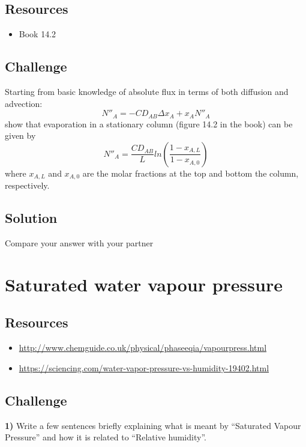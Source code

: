 \subsection*{Resources}
\begin{itemize}
    \item Book 14.2
\end{itemize}

\subsection*{Challenge}
Starting from basic knowledge of absolute flux in terms of both diffusion and advection:
\begin{equation}
    N''_A = -C D_{AB} \Delta x_A + x_A N''_A
\end{equation}
show that evaporation in a stationary column (figure 14.2 in the book) can be given by
\begin{equation}
    N''_A = \frac{C D_{AB}}{L} ln \left( \frac{1-x_{A,L}}{1-x_{A,0}} \right)
\end{equation}
where $x_{A,L}$ and $x_{A,0}$ are the molar fractions at the top and bottom the column, respectively.


\subsection*{Solution}
Compare your answer with your partner




\newpage
\section{Saturated water vapour pressure}

\subsection*{Resources}
\begin{itemize}
    \item \url{http://www.chemguide.co.uk/physical/phaseeqia/vapourpress.html}
    \item \url{https://sciencing.com/water-vapor-pressure-vs-humidity-19402.html}
\end{itemize}

\subsection*{Challenge}
\textbf{1)} Write a few sentences briefly explaining what is meant by ``Saturated Vapour Pressure'' and how it is related to ``Relative humidity''.

